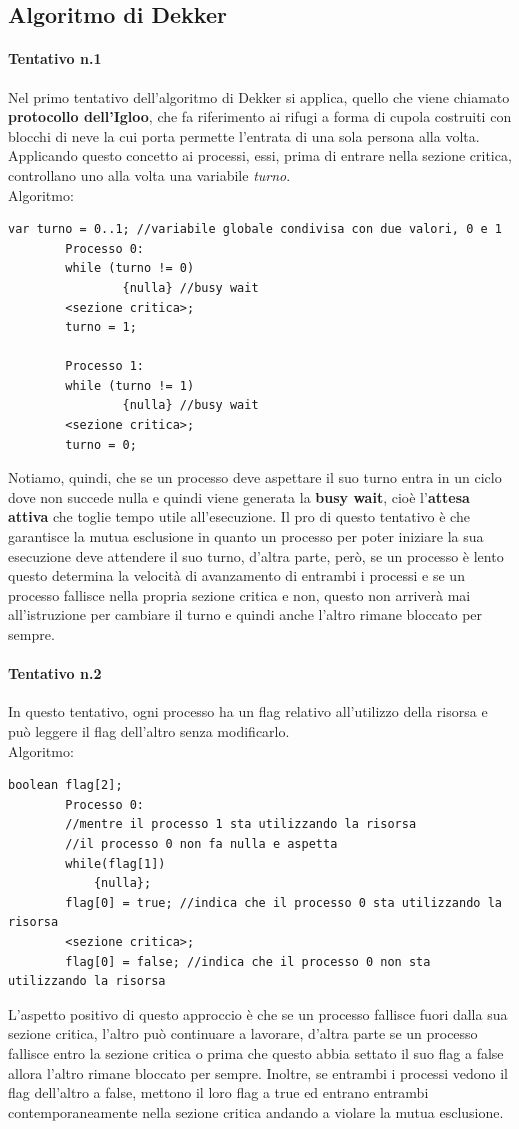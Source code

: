 \documentclass[12pt, letterpaper]{report}
\begin{document}
	\subsection{Algoritmo di Dekker}
	\paragraph{Tentativo n.1}
	Nel primo tentativo dell'algoritmo di Dekker si applica, quello che viene chiamato \textbf{protocollo dell'Igloo}, che fa riferimento ai rifugi a forma di cupola costruiti con blocchi di neve la cui porta permette l'entrata di una sola persona alla volta. Applicando questo concetto ai processi, essi, prima di entrare nella sezione critica, controllano uno alla volta una variabile \textit{turno}. \\
	Algoritmo: \\
	\begin{lstlisting}[style=pascalstyle]
		var turno = 0..1; //variabile globale condivisa con due valori, 0 e 1
		Processo 0:
		while (turno != 0)
				{nulla} //busy wait
		<sezione critica>;
		turno = 1;

		Processo 1:
		while (turno != 1)
				{nulla} //busy wait
		<sezione critica>;
		turno = 0;
	\end{lstlisting}
	Notiamo, quindi, che se un processo deve aspettare il suo turno entra in un ciclo dove non succede nulla e quindi viene generata la \textbf{busy wait}, cioè l'\textbf{attesa attiva} che toglie tempo utile all'esecuzione. Il pro di questo tentativo è che garantisce la mutua esclusione in quanto un processo per poter iniziare la sua esecuzione deve attendere il suo turno, d'altra parte, però, se un processo è lento questo determina la velocità di avanzamento di entrambi i processi e se un processo fallisce nella propria sezione critica e non, questo non arriverà mai all'istruzione per cambiare il turno e quindi anche l'altro rimane bloccato per sempre. \\
	\paragraph{Tentativo n.2} In questo tentativo, ogni processo ha un flag relativo all'utilizzo della risorsa e può leggere il flag dell'altro senza modificarlo. \\
	Algoritmo:
	\begin{lstlisting}[style=pascalstyle]
		boolean flag[2];
		Processo 0:
		//mentre il processo 1 sta utilizzando la risorsa
		//il processo 0 non fa nulla e aspetta
		while(flag[1])
			{nulla};
		flag[0] = true; //indica che il processo 0 sta utilizzando la risorsa
		<sezione critica>;
		flag[0] = false; //indica che il processo 0 non sta utilizzando la risorsa
	\end{lstlisting}
	L'aspetto positivo di questo approccio è che se un processo fallisce fuori dalla sua sezione critica, l'altro può continuare a lavorare, d'altra parte se un processo fallisce entro la sezione critica o prima che questo abbia settato il suo flag a false allora l'altro rimane bloccato per sempre. Inoltre, se entrambi i processi vedono il flag dell'altro a false, mettono il loro flag a true ed entrano entrambi contemporaneamente nella sezione critica andando a violare la mutua esclusione.
\end{document}

